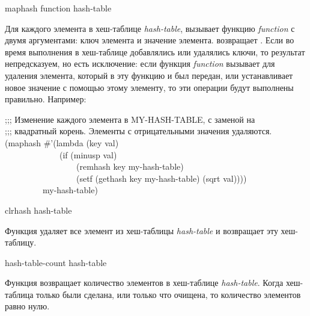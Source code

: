 \begin{defun}[Function]
maphash function hash-table

Для каждого элемента в хеш-таблице \emph{hash-table},  вызывает
функцию \emph{function} с двумя аргументами:
ключ элемента и
значение элемента.
 возвращает .
Если во время выполнения  в хеш-таблице добавлялись или удалялись
ключи, то результат непредсказуем, но есть исключение:
если функция \emph{function} вызывает  для удаления элемента,
который в эту функцию и был передан, или устанавливает новое значение с помощью
 этому элементу, то эти операции будут выполнены правильно.
Например:
\begin{lisp}
;;; Изменение каждого элемента в MY-HASH-TABLE, с заменой на \\
;;; квадратный корень. Элементы с отрицательными значения удаляются. \\
(maphash \#'(lambda (key val) \\
~~~~~~~~~~~~~(if (minusp val) \\
~~~~~~~~~~~~~~~~~(remhash key my-hash-table) \\
~~~~~~~~~~~~~~~~~(setf (gethash key my-hash-table) (sqrt val)))) \\
~~~~~~~~~my-hash-table)
\end{lisp}
\end{defun}

\begin{defun}[Function]
clrhash hash-table

Функция удаляет все элемент из хеш-таблицы \emph{hash-table} и возвращает эту
хеш-таблицу.
\end{defun}

\begin{defun}[Function]
hash-table-count hash-table

Функция возвращает количество элементов в хеш-таблице \emph{hash-table}.
Когда хеш-таблица только были сделана, или только что очищена, то количество
элементов равно нулю.
\end{defun}

